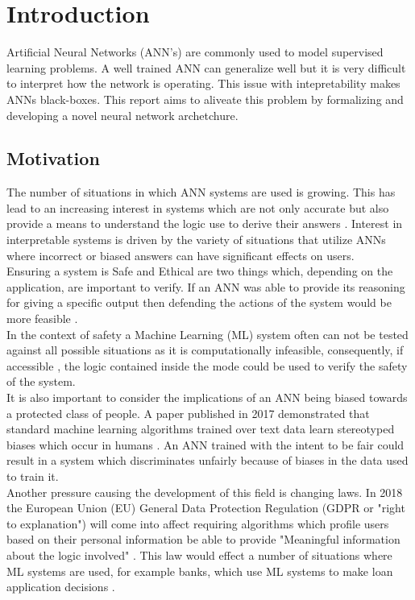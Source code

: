 \chapter{Introduction}\label{C:intro}

Artificial Neural Networks (ANN's) are commonly used to model supervised learning problems. A well trained ANN can generalize well but it is very difficult to interpret how the network is operating. This issue with intepretability makes ANNs black-boxes. This report aims to aliveate this problem by formalizing and developing a novel neural network archetchure.

\section{Motivation}
The number of situations in which ANN systems are used is growing. This has lead to an increasing interest in systems which are not only accurate but also provide a means to understand the logic use to derive their answers \cite{doshi2017towards}. Interest in interpretable systems is driven by the variety of situations that utilize ANNs where incorrect or biased answers can have significant effects on users.\\

Ensuring a system is Safe and Ethical are two things which, depending on the application, are important to verify. If an ANN was able to provide its reasoning for giving a specific output then defending the actions of the system would be more feasible \cite{doshi2017towards}.\\

In the context of safety a Machine Learning (ML) system often can not be tested against all possible situations as it is computationally infeasible, consequently, if accessible , the logic contained inside the mode could be used to verify the safety of the system.\\

It is also important to consider the implications of an ANN being biased towards a protected class of people. A paper published in 2017 demonstrated that standard machine learning algorithms trained over text data learn stereotyped biases which occur in humans \cite{caliskan2017semantics}. An ANN trained with the intent to be fair could result in a system which discriminates unfairly because of biases in the data used to train it.\\

Another pressure causing the development of this field is changing laws. In 2018 the European Union (EU) General Data Protection Regulation (GDPR or "right to explanation") will come into affect requiring algorithms which profile users based on their personal information be able to provide "Meaningful information about the logic involved"  \cite{eu-dgpr}. This law would effect a number of situations where ML systems are used, for example banks, which use ML systems to make loan application decisions \cite{goodman2016european}.\\

